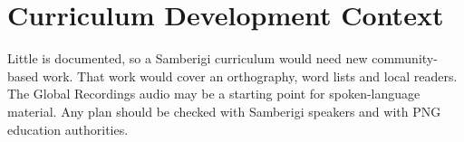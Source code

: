 \documentclass[12pt]{article}
\begin{document}
\section{Curriculum Development Context}
Little is documented, so a Samberigi curriculum would need new community-based work. That work would cover an orthography, word lists and local readers. The Global Recordings audio may be a starting point for spoken-language material. Any plan should be checked with Samberigi speakers and with PNG education authorities.
\end{document}
